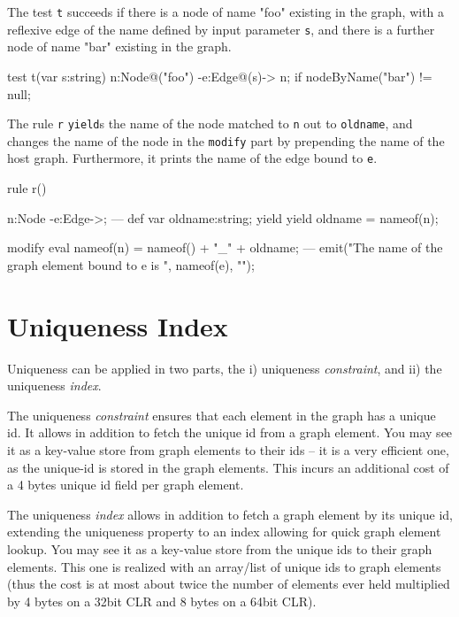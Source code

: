 \begin{example}
The test \texttt{t} succeeds if there is a node of name "foo" existing in the graph, with a reflexive edge of the name defined by input parameter \texttt{s}, and there is a further node of name "bar" existing in the graph.

\begin{grgen}
test t(var s:string) {
  n:Node{@("foo")} -e:Edge{@(s)}-> n;
  if{ nodeByName("bar") != null; }
}
\end{grgen}

The rule \texttt{r} \texttt{yield}s the name of the node matched to \texttt{n} out to \texttt{oldname}, and changes the name of the node in the \texttt{modify} part by prepending the name of the host graph. Furthermore, it prints the name of the edge bound to \texttt{e}.

\begin{grgen}
rule r() {
  n:Node -e:Edge->;
---
  def var oldname:string;
  yield { yield oldname = nameof(n); }
		
  modify {
    eval {
      nameof(n) = nameof() + "_" + oldname;
    }
  ---
    emit("The name of the graph element bound to e is ", nameof(e), "\n");
  }
}
\end{grgen}

\end{example}


\section{Uniqueness Index}\label{sec:uniqueness}
Uniqueness can be applied in two parts, the i) uniqueness \emph{constraint}, and ii) the uniqueness \emph{index}.

The uniqueness \emph{constraint} ensures that each element in the graph has a unique id. 
It allows in addition to fetch the unique id from a graph element.
You may see it as a key-value store from graph elements to their ids -- it is a very efficient one, as the unique-id is stored in the graph elements. 
This incurs an additional cost of a 4 bytes unique id field per graph element.

The uniqueness \emph{index} allows in addition to fetch a graph element by its unique id, extending the uniqueness property to an index allowing for quick graph element lookup.
You may see it as a key-value store from the unique ids to their graph elements.
This one is realized with an array/list of unique ids to graph elements (thus the cost is at most about twice the number of elements ever held multiplied by 4 bytes on a 32bit CLR and 8 bytes on a 64bit CLR).

